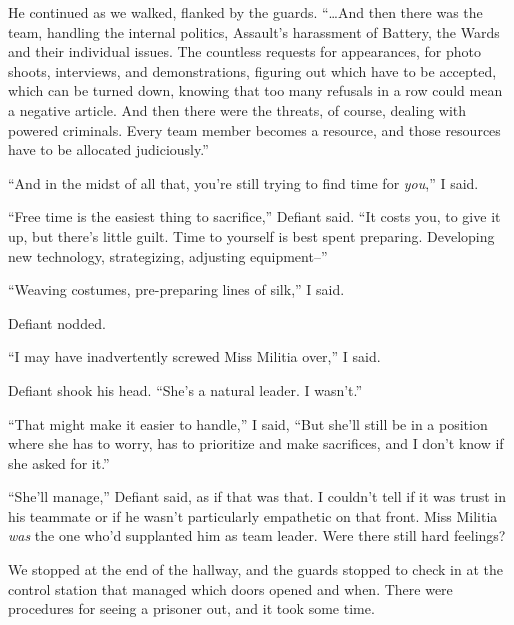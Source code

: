 He continued as we walked, flanked by the guards.  ``\ldots{}And then there was the team, handling the internal politics, Assault's harassment of Battery, the Wards and their individual issues.  The countless requests for appearances, for photo shoots, interviews, and demonstrations, figuring out which have to be accepted, which can be turned down, knowing that too many refusals in a row could mean a negative article.  And then there were the threats, of course, dealing with powered criminals.  Every team member becomes a resource, and those resources have to be allocated judiciously.''



``And in the midst of all that, you're still trying to find time for \emph{you},'' I said.



``Free time is the easiest thing to sacrifice,'' Defiant said.  ``It costs you, to give it up, but there's little guilt.  Time to yourself is best spent preparing.  Developing new technology, strategizing, adjusting equipment--''



``Weaving costumes, pre-preparing lines of silk,'' I said.



Defiant nodded.



``I may have inadvertently screwed Miss Militia over,'' I said.



Defiant shook his head.  ``She's a natural leader.  I wasn't.''



``That might make it easier to handle,'' I said, ``But she'll still be in a position where she has to worry, has to prioritize and make sacrifices, and I don't know if she asked for it.''



``She'll manage,'' Defiant said, as if that was that.  I couldn't tell if it was trust in his teammate or if he wasn't particularly empathetic on that front.  Miss Militia \emph{was} the one who'd supplanted him as team leader.  Were there still hard feelings?



We stopped at the end of the hallway, and the guards stopped to check in at the control station that managed which doors opened and when.  There were procedures for seeing a prisoner out, and it took some time.



